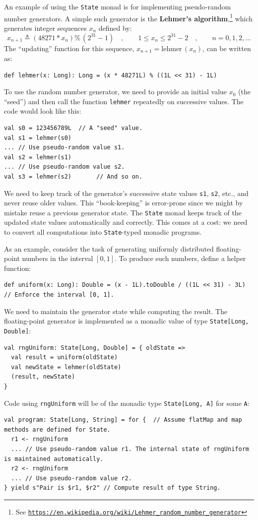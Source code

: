 An example of using the \lstinline!State! monad is for implementing
pseudo-random number generators. A simple such generator is the \textbf{Lehmer\textsf{'}s
algorithm},\footnote{See \texttt{\href{https://en.wikipedia.org/wiki/Lehmer_random_number_generator}{https://en.wikipedia.org/wiki/Lehmer\_random\_number\_generator}}}
which generates integer sequences $x_{n}$ defined by:
\[
x_{n+1}\triangleq\left(48271*x_{n}\right)\%\,(2^{31}-1)\quad,\quad\quad1\leq x_{n}\leq2^{31}-2\quad,\quad\quad n=0,1,2,...
\]
The \textsf{``}updating\textsf{''} function for this sequence, $x_{n+1}=\text{lehmer}\,(x_{n})$,
can be written as:
\begin{lstlisting}
def lehmer(x: Long): Long = (x * 48271L) % ((1L << 31) - 1L)
\end{lstlisting}
 To use the random number generator, we need to provide an initial
value $x_{0}$ (the \textsf{``}seed\textsf{''}) and then call the function \lstinline!lehmer!
repeatedly on successive values. The code would look like this:
\begin{lstlisting}
val s0 = 123456789L  // A "seed" value.
val s1 = lehmer(s0)
... // Use pseudo-random value s1.
val s2 = lehmer(s1)
... // Use pseudo-random value s2.
val s3 = lehmer(s2)       // And so on.
\end{lstlisting}
We need to keep track of the generator\textsf{'}s successive state values \lstinline!s1!,
\lstinline!s2!, etc., and never reuse older values. This \textsf{``}book\nobreakdash-keeping\textsf{''}
is error-prone since we might by mistake reuse a previous generator
state. The \lstinline!State! monad keeps track of the updated state
values automatically and correctly. This comes at a cost: we need
to convert all computations into \lstinline!State!-typed monadic
programs.

As an example, consider the task of generating uniformly distributed
floating-point numbers in the interval $\left[0,1\right]$. To produce
such numbers, define a helper function:
\begin{lstlisting}
def uniform(x: Long): Double = (x - 1L).toDouble / ((1L << 31) - 3L)  // Enforce the interval [0, 1].
\end{lstlisting}

We need to maintain the generator state while computing the result.
The floating-point generator is implemented as a monadic value of
type \lstinline!State[Long, Double]!:
\begin{lstlisting}
val rngUniform: State[Long, Double] = { oldState =>
  val result = uniform(oldState)
  val newState = lehmer(oldState)
  (result, newState)
}
\end{lstlisting}
Code using \lstinline!rngUniform! will be of the monadic type \lstinline!State[Long, A]!
for some \lstinline!A!:
\begin{lstlisting}
val program: State[Long, String] = for {  // Assume flatMap and map methods are defined for State.
  r1 <- rngUniform
  ... // Use pseudo-random value r1. The internal state of rngUniform is maintained automatically.
  r2 <- rngUniform
  ... // Use pseudo-random value r2.
} yield s"Pair is $r1, $r2" // Compute result of type String.
\end{lstlisting}

